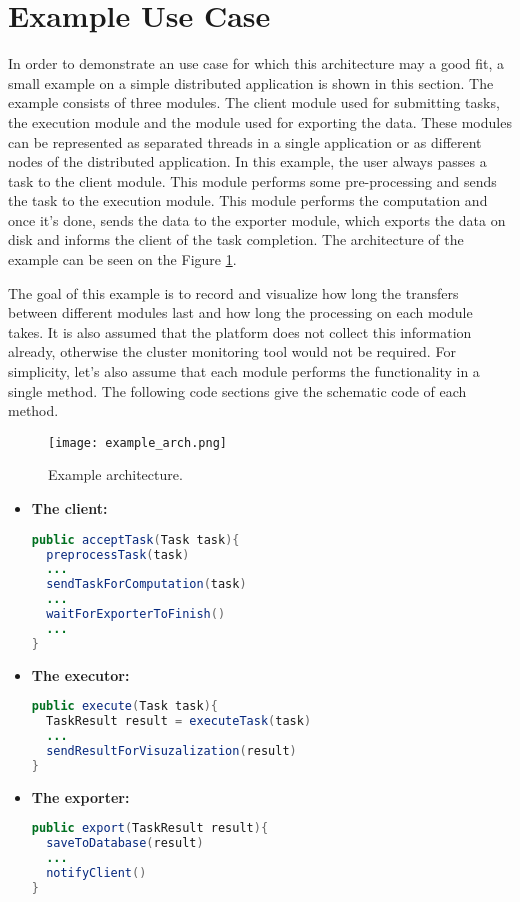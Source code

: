 \section{Example Use Case}
\label{design:use_case}
In order to demonstrate an use case for which this architecture may a good fit, a small example on a simple distributed application is shown in this section. The example consists of three modules. The client module used for submitting tasks, the execution module and the module used for exporting the data. These modules can be represented as separated threads in a single application or as different nodes of the distributed application. In this example, the user always passes a task to the client module. This module performs some pre-processing and sends the task to the execution module. This module performs the computation and once it's done, sends the data to the exporter module, which exports the data on disk and informs the client of the task completion. The architecture of the example can be seen on the Figure \ref{fig:example_arch}.

The goal of this example is to record and visualize how long the transfers between different modules last and how long the processing on each module takes. It is also assumed that the platform does not collect this information already, otherwise the cluster monitoring tool would not be required. For simplicity, let's also assume that each module performs the functionality in a single method. The following code sections give the schematic code of each method.

	\begin{figure}
		\centering
		\texttt{[image: example\_arch.png]}
		\caption{Example architecture.}
		\label{fig:example_arch}
	\end{figure}



\begin{itemize}
\item \textbf{The client:}
\begin{lstlisting}[language=Java]
public acceptTask(Task task){
  preprocessTask(task)
  ...
  sendTaskForComputation(task)
  ...
  waitForExporterToFinish()
  ...
}
\end{lstlisting}

\item \textbf{The executor:}
\begin{lstlisting}[language=Java]
public execute(Task task){
  TaskResult result = executeTask(task)
  ...
  sendResultForVisuzalization(result)
}
\end{lstlisting}

\item \textbf{The exporter:}
\begin{lstlisting}[language=Java]
public export(TaskResult result){
  saveToDatabase(result)
  ...
  notifyClient()
}
\end{lstlisting}
\end{itemize}

